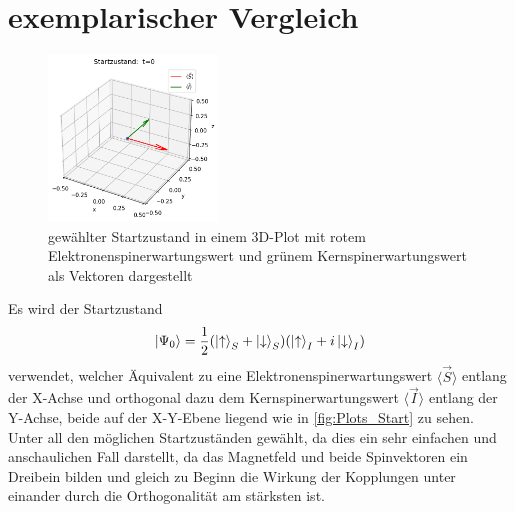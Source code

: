 \section{exemplarischer Vergleich}
\begin{figure}
    \centering
    \includegraphics[width = 0.4\textwidth]{Abbildungen/Plot_Vektor_Start.png}
    \caption{gewählter Startzustand in einem 3D-Plot mit rotem Elektronenspinerwartungswert und grünem Kernspinerwartungswert als Vektoren dargestellt}
    \label{fig:Plots_Start}
\end{figure}
Es wird der Startzustand 
\begin{align}
    \ket{\Psi_0}=\frac{1}{2}(\ket{\uparrow}_S + \ket{\downarrow}_S)(\ket{\uparrow}_I + i\ket{\downarrow}_I)
\end{align}
verwendet, welcher Äquivalent zu eine Elektronenspinerwartungswert $\langle\vec{S}\rangle$ entlang der X-Achse und orthogonal
dazu dem Kernspinerwartungswert $\langle\vec{I}\rangle$ entlang der Y-Achse, beide auf der X-Y-Ebene liegend wie in \autoref{fig:Plots_Start} zu sehen.
Unter all den möglichen Startzuständen gewählt, da dies ein sehr einfachen und anschaulichen Fall darstellt, da das Magnetfeld und beide Spinvektoren 
ein Dreibein bilden und gleich zu Beginn die Wirkung der Kopplungen unter einander durch die Orthogonalität am stärksten ist.


